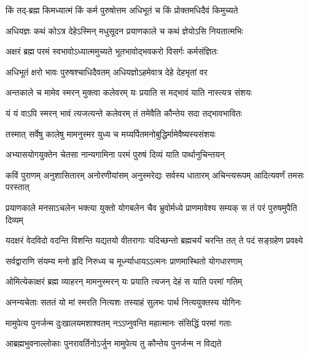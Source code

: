 \twolineshloka
{किं तद्-ब्रह्म किमध्यात्मं किं कर्म पुरुषोत्तम}
{अधिभूतं च किं प्रोक्तमधिदैवं किमुच्यते}%

\twolineshloka
{अधियज्ञः कथं कोऽत्र देहेऽस्मिन् मधुसूदन}
{प्रयाणकाले च कथं ज्ञेयोऽसि नियतात्मभिः}%

\twolineshloka
{अक्षरं ब्रह्म परमं स्वभावोऽध्यात्ममुच्यते}
{भूतभावोद्भवकरो विसर्गः कर्मसंज्ञितः}%

\twolineshloka
{अधिभूतं क्षरो भावः पुरुषश्चाधिदैवतम्}
{अधियज्ञोऽहमेवात्र देहे देहभृतां वर}%

\twolineshloka
{अन्तकाले च मामेव स्मरन् मुक्त्वा कलेवरम्}
{यः प्रयाति स मद्भावं याति नास्त्यत्र संशयः}%

\twolineshloka
{यं यं वाऽपि स्मरन् भावं त्यजत्यन्ते कलेवरम्}
{तं तमेवैति कौन्तेय सदा तद्भावभावितः}%

\twolineshloka
{तस्मात् सर्वेषु कालेषु मामनुस्मर युध्य च}
{मय्यर्पितमनोबुद्धिर्मामेवैष्यस्यसंशयः}%

\twolineshloka
{अभ्यासयोगयुक्तेन चेतसा नान्यगामिना}
{परमं पुरुषं दिव्यं याति पार्थानुचिन्तयन्}%

\fourlineindentedshloka
{कविं पुराणम् अनुशासितारम्}
{अनोरणीयांसम् अनुस्मरेद्यः}
{सर्वस्य धातारम् अचिन्त्यरूपम्}
{आदित्यवर्णं तमसः परस्तात्}%

\fourlineindentedshloka
{प्रयाणकाले मनसाऽचलेन}
{भक्त्या युक्तो योगबलेन चैव}
{भ्रुवोर्मध्ये प्राणमावेश्य सम्यक्}
{स तं परं पुरुषमुपैति दिव्यम्}%

\fourlineindentedshloka
{यदक्षरं वेदविदो वदन्ति}
{विशन्ति यद्यतयो वीतरागाः}
{यदिच्छन्तो ब्रह्मचर्यं चरन्ति}
{तत् ते पदं सङ्ग्रहेण प्रवक्ष्ये}%

\twolineshloka
{सर्वद्वाराणि संयम्य मनो हृदि निरुध्य च}
{मूर्ध्न्याधायऽऽत्मनः प्राणमास्थितो योगधारणाम्}%

\twolineshloka
{ओमित्येकाक्षरं ब्रह्म व्याहरन् मामनुस्मरन्}
{यः प्रयाति त्यजन् देहं स याति परमां गतिम्}%

\twolineshloka
{अनन्यचेताः सततं यो मां स्मरति नित्यशः}
{तस्याहं सुलभः पार्थ नित्ययुक्तस्य योगिनः}%

\twolineshloka
{मामुपेत्य पुनर्जन्म दुःखालयमशाश्वतम्}
{नऽऽप्नुवन्ति महात्मानः संसिद्धिं परमां गताः}%

\twolineshloka
{आब्रह्मभुवनाल्लोकाः पुनरावर्तिनोऽर्जुन}
{मामुपेत्य तु कौन्तेय पुनर्जन्म न विद्यते}%

